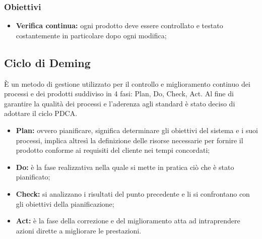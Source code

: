 \subsubsection{Obiettivi}
\begin{itemize}
    \item \textbf{Verifica continua:} ogni prodotto deve essere controllato e testato costantemente in particolare dopo ogni modifica;
\end{itemize}

\subsection{Ciclo di Deming}
È un metodo di gestione utilizzato per il controllo e miglioramento continuo dei processi e dei prodotti suddiviso in 4 fasi: Plan, Do, Check, Act.
Al fine di garantire la qualità dei processi e l'aderenza agli standard è stato deciso di adottare il ciclo PDCA.
\begin{itemize}
    \item \textbf{Plan:} ovvero pianificare, significa determinare gli obiettivi del sistema e i suoi processi, implica altresì la definizione delle risorse necessarie per fornire il prodotto conforme ai requisiti del cliente nei tempi concordati;
    \item \textbf{Do:} è la fase realizzativa nella quale si mette in pratica ciò che è stato pianificato;
    \item \textbf{Check:} si analizzano i risultati del punto precedente e li si confrontano con gli obiettivi della pianificazione;
    \item \textbf{Act:} è la fase della correzione e del miglioramento atta ad intraprendere azioni dirette a migliorare le prestazioni.
\end{itemize}